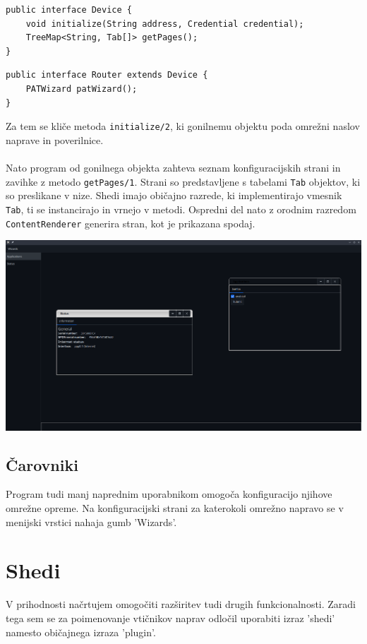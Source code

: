 \documentclass[12pt]{article}
\begin{document}
\begin{lstlisting}
public interface Device {
	void initialize(String address, Credential credential);
	TreeMap<String, Tab[]> getPages();
}
\end{lstlisting}

\begin{lstlisting}
public interface Router extends Device {
	PATWizard patWizard();
}
\end{lstlisting}
Za tem se kliče metoda \texttt{initialize/2}, ki gonilnemu objektu poda
omrežni naslov naprave in poverilnice.
\\\\
Nato program od gonilnega objekta zahteva seznam konfiguracijskih strani
in zavihke z metodo \texttt{getPages/1}. Strani so predstavljene s tabelami
\texttt{Tab} objektov, ki so preslikane v nize. Shedi imajo običajno razrede,
ki implementirajo vmesnik \texttt{Tab}, ti se instancirajo in vrnejo v
metodi. Ospredni del nato z orodnim razredom \texttt{ContentRenderer}
generira stran, kot je prikazana spodaj.

\begin{center}
	\includegraphics[scale=0.28]{slike/config-window.png}
\end{center}
\newpage

\subsection{Čarovniki}
Program tudi manj naprednim uporabnikom omogoča konfiguracijo njihove
omrežne opreme. Na konfiguracijski strani za katerokoli omrežno napravo
se v menijski vrstici nahaja gumb 'Wizards'.  
\newpage

\section{Shedi}
V prihodnosti načrtujem omogočiti razširitev tudi drugih funkcionalnosti.
Zaradi tega sem se za poimenovanje vtičnikov naprav odločil uporabiti
izraz 'shedi' namesto običajnega izraza 'plugin'.
\end{document}
